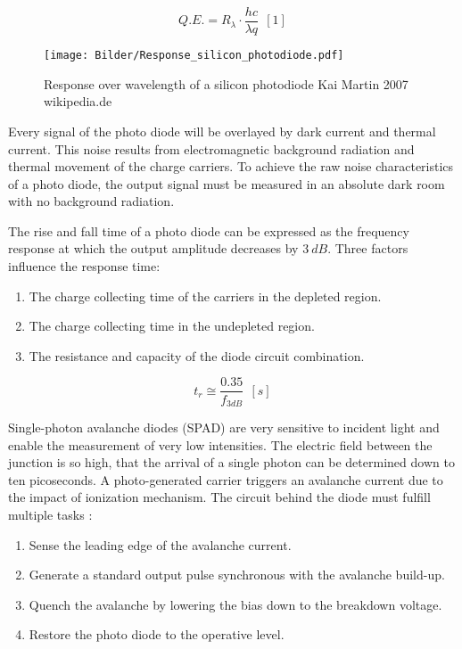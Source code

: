 \begin{equation}
Q.E. = R_\lambda \cdot \frac {h c} {\lambda q}~~[1]
\end{equation}

\begin{figure} [!h]
	\centering
	\texttt{[image: Bilder/Response\_silicon\_photodiode.pdf]}
	\caption{Response over wavelength of a silicon photodiode \tiny Kai Martin 2007 wikipedia.de \ccbysa}
	\label{fig:response}
\end{figure}

Every signal of the photo diode will be overlayed by dark current and thermal current. This noise results from electromagnetic background radiation and thermal movement of the charge carriers. To achieve the raw noise characteristics of a photo diode, the output signal must be measured in an absolute dark room with no background radiation. 

The rise and fall time of a photo diode can be expressed as the frequency response at which the output amplitude decreases by $3~dB$. Three factors influence the response time:
\medskip \\
\begin{enumerate}
\setlength\itemsep{0.001em}
\item The charge collecting time of the carriers in the depleted region. 
\item The charge collecting time in the undepleted region.
\item The resistance and capacity of the diode circuit combination.
\end{enumerate}

\begin{equation}
t_r \cong \frac{0.35}{f_{3dB}}~~[s]
\end{equation}
\medskip

Single-photon avalanche diodes (SPAD) are very sensitive to incident light and enable the measurement of very low intensities. The electric field between the junction is so high, that the arrival of a single photon can be determined down to ten picoseconds. A photo-generated carrier triggers an avalanche current due to the impact of ionization mechanism. The circuit behind the diode must fulfill multiple tasks \cite{cova1996avalanche}:

\begin{enumerate}
	\setlength\itemsep{0.001em}
	\item Sense the leading edge of the avalanche current. 
	\item Generate a standard output pulse synchronous with the avalanche build-up.
	\item Quench the avalanche by lowering the bias down to the breakdown voltage.
	\item Restore the photo diode to the operative level.
\end{enumerate}

